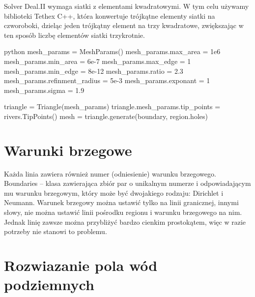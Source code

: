 \documentclass[]{pracamgr}
\begin{document}
      Solver Deal.II\cite{dealII94} wymaga siatki z elementami kwadratowymi. W tym celu używamy biblioteki Tethex \cite{tethex} C++, która konwertuje trójkątne elementy siatki na czworoboki, dzieląc jeden trójkątny element na trzy kwadratowe, zwiększając w ten sposób liczbę elementów siatki trzykrotnie.

      \begin{mintedbox}{python}
        mesh_params = MeshParams()
        mesh_params.max_area = 1e6
        mesh_params.min_area = 6e-7
        mesh_params.max_edge = 1
        mesh_params.min_edge = 8e-12
        mesh_params.ratio = 2.3
        mesh_params.refinment_radius = 5e-3
        mesh_params.exponant = 1
        mesh_params.sigma = 1.9
      
        triangle = Triangle(mesh_params)
        triangle.mesh_params.tip_points = rivers.TipPoints()
        mesh = triangle.generate(boundary, region.holes)\end{mintedbox}

    \section{Warunki brzegowe}

      Każda linia zawiera również numer (odniesienie) warunku brzegowego. Boundaries -- klasa zawierająca zbiór par o unikalnym numerze i odpowiadającym mu warunku brzegowym, który może być dwojakiego rodzaju: Dirichlet i Neumann. Warunek brzegowy można ustawić tylko na linii granicznej, innymi słowy, nie można ustawić linii pośrodku regionu i warunku brzegowego na nim. Jednak linię zawsze można przybliżyć bardzo cienkim prostokątem, więc w razie potrzeby nie stanowi to problemu.

    \section{Rozwiazanie pola wód podziemnych}
\end{document}
